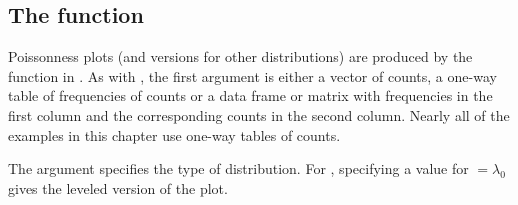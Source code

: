 \documentclass[10pt,krantz2]{krantz}\usepackage[]{graphicx}\usepackage[]{color}
\begin{document}
\subsection[The distplot function]{The  function}
Poissonness plots (and versions for other distributions)
are produced by the function  in .
As with , the first argument is
either a vector of counts, a one-way table of frequencies of counts or a data frame or matrix with frequencies in the first column and the corresponding counts in the second column. Nearly all of the examples in this chapter use one-way tables of counts.

The  argument specifies the type of distribution. For ,
specifying a value for  $=\lambda_0$ gives the leveled version of the
plot.
\end{document}
